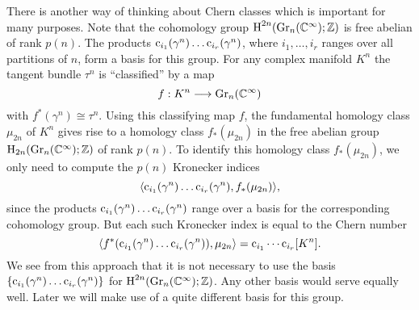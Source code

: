 \documentclass[../main]{subfiles}
\begin{document}
There is another way of thinking about Chern classes which is important for many purposes. Note that the cohomology group $\operatorname{H}^{2n}(\operatorname{Gr}_n({\mathbb C}^\infty); \mathbb Z)$ is free abelian of rank $p(n)$. The products $\operatorname{c}_{i_1}(\gamma^n) \ldots \operatorname{c}_{i_r}(\gamma^n)$, where $i_1, \ldots, i_r$ ranges over all partitions of $n$, form a basis for this group. For any complex manifold $K^n$ the tangent bundle $\tau^n$ is ``classified'' by a map \[f : K^n \longrightarrow \operatorname{Gr}_n({\mathbb C}^\infty)\] with $f^\ast(\gamma^n) \cong \tau^n$. Using this classifying map $f$, the fundamental homology class $\mu_{2n}$ of $K^n$ gives rise to a homology class $f_\ast(\mu_{2n})$ in the free abelian group $\operatorname{H}_{2n}(\operatorname{Gr}_n({\mathbb C}^\infty); \mathbb Z)$ of rank $p(n)$. To identify this homology class $f_\ast(\mu_{2n})$, we only need to compute the $p(n)$ Kronecker indices \[\langle\operatorname{c}_{i_1}(\gamma^n) \ldots \operatorname{c}_{i_r}(\gamma^n),f_\ast(\mu_{2n})\rangle,\] since the products $\operatorname{c}_{i_1}(\gamma^n) \ldots \operatorname{c}_{i_r}(\gamma^n)$ range over a basis for the corresponding cohomology group. But each such Kronecker index is equal to the Chern number \[\langle f^\ast(\operatorname{c}_{i_1}(\gamma^n) \ldots \operatorname{c}_{i_r}(\gamma^n)),\mu_{2n}\rangle = \operatorname{c}_{i_1} \cdots \operatorname{c}_{i_r}[K^n].\] We see from this approach that it is not necessary to use the basis $\{\operatorname{c}_{i_1}(\gamma^n) \ldots \operatorname{c}_{i_r}(\gamma^n)\}$ for $\operatorname{H}^{2n}(\operatorname{Gr}_n({\mathbb C}^\infty); \mathbb Z)$. Any other basis would serve equally well. Later we will make use of a quite different basis for this group. 
\end{document}
